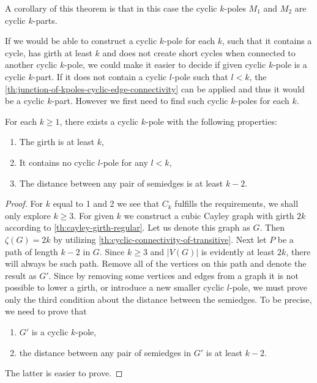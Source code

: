 \documentclass[12pt, twoside]{book}
\begin{document}
A corollary of this theorem is that in this case the cyclic $k$-poles $M_1$ and $M_2$ are cyclic $k$-parts.

If we would be able to construct a cyclic $k$-pole for each $k$, such that it contains a cycle, has girth at least $k$ and does not create short cycles when connected to another cyclic $k$-pole, we could make it easier to decide if given cyclic $k$-pole is a cyclic $k$-part. If it does not contain a cyclic $l$-pole such that $l<k$, the \cref{th:junction-of-kpoles-cyclic-edge-connectivity} can be applied and thus it would be a cyclic $k$-part. However we first need to find such cyclic $k$-poles for each $k$. 

\begin{lemma}\label{lem:cyclic-k-pole-no-short-cycles-exists}
	For each $k\geq 1$, there exists a cyclic $k$-pole with the following properties:
	\begin{enumerate}
		\item The girth is at least $k$,
		\item It contains no cyclic $l$-pole for any $l<k$,
		\item The distance between any pair of semiedges is at least $k-2$.
	\end{enumerate}
\end{lemma}

\begin{proof}
	For $k$ equal to 1 and 2 we see that $C_k$ fulfills the requirements, we shall only explore $k\geq 3$. For given $k$ we construct a cubic Cayley graph with girth $2k$ according to \cref{th:cayley-girth-regular}. Let us denote this graph as $G$. Then $\zeta(G)=2k$ by utilizing \cref{th:cyclic-connectivity-of-transitive}. Next let $P$ be a path of length $k-2$ in $G$. Since $k\geq 3$ and $|V(G)|$ is evidently at least $2k$, there will always be such path. Remove all of the vertices on this path and denote the result as $G'$. Since by removing some vertices and edges from a graph it is not possible to lower a girth, or introduce a new smaller cyclic $l$-pole, we must prove only the third condition about the distance between the semiedges. To be precise, we need to prove that
	\begin{enumerate}
		\item $G'$ is a cyclic $k$-pole,
		\item the distance between any pair of semiedges in $G'$ is at least $k-2$.
	\end{enumerate}
	The latter is easier to prove. 
	
\end{proof}
\end{document}

